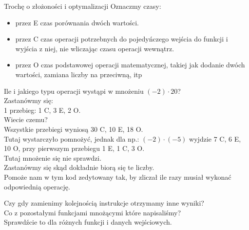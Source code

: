 \begin{frame}{Trochę o złożoności i optymalizacji}
    Oznaczmy czasy:
    \begin{itemize}
        \item przez E czas porównania dwóch wartości. \\
        \item przez C czas operacji potrzebnych do pojedyńczego wejścia do funkcji i wyjścia z niej, nie wliczając czasu operacji wewnątrz. \\
        \item przez O czas podstawowej operacji matematycznej, takiej jak dodanie dwóch wartości, zamiana liczby na przeciwną, itp
    \end{itemize}
    Ile i jakiego typu operacji wystąpi w mnożeniu $(-2) \cdot 20$? \\
    Zastanówmy się: \\
    1 przebieg: 1 C, 3 E, 2 O. \\
    Wiecie czemu? \\
    Wszystkie przebiegi wyniosą 30 C, 10 E, 18 O. \\
    Tutaj wystarczyło pomnożyć, jednak dla np.: $(-2) \cdot (-5)$ wyjdzie 7 C, 6 E, 10 O, przy pierwszym przebiegu 1 E, 1 C, 3 O. \\
    Tutaj mnożenie się nie sprawdzi. \\
    Zastanówmy się skąd dokładnie biorą się te liczby. \\
    Pomoże nam w tym kod zedytowany tak, by zliczał ile razy musiał wykonać odpowiednią operację.
    
    Czy gdy zamienimy kolejnością instrukcje otrzymamy inne wyniki? \\
    Co z pozostałymi funkcjami mnożącymi które napisaliśmy? \\
    Sprawdźcie to dla różnych funkcji i danych wejściowych.
\end{frame}